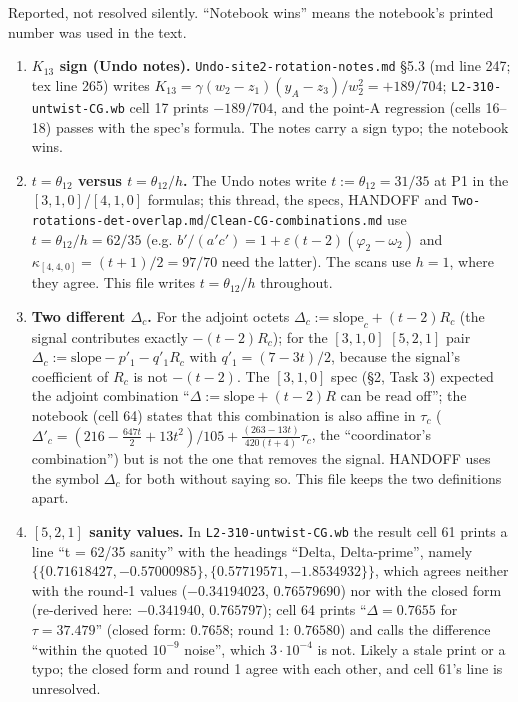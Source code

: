\documentclass[10pt]{article}
\newcommand{\nb}[1]{\texttt{#1}}
\begin{document}
Reported, not resolved silently. ``Notebook wins'' means the notebook's printed number was used in the text.

\begin{enumerate}\setlength{\itemsep}{1pt}
\item \textbf{$K_{13}$ sign (Undo notes).} \nb{Undo-\allowbreak{}site2-\allowbreak{}rotation-\allowbreak{}notes.\allowbreak{}md} \S{}5.3 (md line 247; tex line 265) writes $K_{13}=\gamma(w_2-z_1)(y_A-z_3)/w_2^2=+189/704$; \nb{L2-\allowbreak{}310-\allowbreak{}untwist-\allowbreak{}CG.\allowbreak{}wb} cell 17 prints $-189/704$, and the point-A regression (cells 16--18) passes with the spec's formula. The notes carry a sign typo; the notebook wins.
\item \textbf{$t=\theta_{12}$ versus $t=\theta_{12}/h$.} The Undo notes write $t:=\theta_{12}=31/35$ at P1 in the $[3,1,0]$/$[4,1,0]$ formulas; this thread, the specs, HANDOFF and \nb{Two-\allowbreak{}rotations-\allowbreak{}det-\allowbreak{}overlap.\allowbreak{}md}/\nb{Clean-\allowbreak{}CG-\allowbreak{}combinations.\allowbreak{}md} use $t=\theta_{12}/h=62/35$ (e.g. $b'/(a'c')=1+\varepsilon(t-2)(\varphi_2-\omega_2)$ and $\kappa_{[4,4,0]}=(t+1)/2=97/70$ need the latter). The scans use $h=1$, where they agree. This file writes $t=\theta_{12}/h$ throughout.
\item \textbf{Two different $\Delta_c$.} For the adjoint octets $\Delta_c:=\mathrm{slope}_c+(t-2)R_c$ (the signal contributes exactly $-(t-2)R_c$); for the $[3,1,0]$ $[5,2,1]$ pair $\Delta_c:=\mathrm{slope}-p'_1-q'_1R_c$ with $q'_1=(7-3t)/2$, because the signal's coefficient of $R_c$ is not $-(t-2)$. The $[3,1,0]$ spec (\S{}2, Task 3) expected the adjoint combination ``$\Delta:=\mathrm{slope}+(t-2)R$ can be read off''; the notebook (cell 64) states that this combination is also affine in $\tau_c$ ($\Delta'_c=(216-\frac{647t}2+13t^2)/105+\frac{(263-13t)}{420(t+4)}\tau_c$, the ``coordinator's combination'') but is not the one that removes the signal. HANDOFF uses the symbol $\Delta_c$ for both without saying so. This file keeps the two definitions apart.
\item \textbf{$[5,2,1]$ sanity values.} In \nb{L2-\allowbreak{}310-\allowbreak{}untwist-\allowbreak{}CG.\allowbreak{}wb} the result cell 61 prints a line ``t = 62/35 sanity'' with the headings ``Delta, Delta-prime'', namely $\{\{0.71618427,-0.57000985\},\{0.57719571,-1.8534932\}\}$, which agrees neither with the round-1 values ($-0.34194023$, $0.76579690$) nor with the closed form (re-derived here: $-0.341940$, $0.765797$); cell 64 prints ``$\Delta=0.7655$ for $\tau=37.479$'' (closed form: $0.7658$; round 1: $0.76580$) and calls the difference ``within the quoted $10^{-9}$ noise'', which $3\cdot10^{-4}$ is not. Likely a stale print or a typo; the closed form and round 1 agree with each other, and cell 61's line is unresolved.

\end{enumerate}
\end{document}
